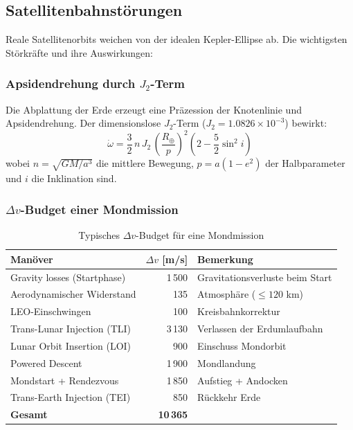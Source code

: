 ﻿\documentclass[12pt,a4paper]{article}
\newcommand{\Dv}{\Delta v}
\begin{document}
\subsection{Satellitenbahnstörungen}

Reale Satellitenorbits weichen von der idealen Kepler-Ellipse ab. Die wichtigsten
Störkräfte und ihre Auswirkungen:

\subsubsection{Apsidendrehung durch $J_2$-Term}

Die Abplattung der Erde erzeugt eine Präzession der Knotenlinie und Apsidendrehung.
Der dimensionslose $J_2$-Term ($J_2 = 1.0826 \times 10^{-3}$) bewirkt:
\[
  \dot{\omega} = \frac{3}{2}\,n\,J_2\,\left(\frac{R_\oplus}{p}\right)^2
    \left(2 - \frac{5}{2}\sin^2 i\right)
\]
wobei $n = \sqrt{GM/a^3}$ die mittlere Bewegung, $p = a(1-e^2)$ der Halbparameter
und $i$ die Inklination sind.

\subsubsection{$\Delta v$-Budget einer Mondmission}

\begin{table}[H]
\centering
\caption{Typisches $\Dv$-Budget für eine Mondmission}
\label{tab:dv_mond}
\begin{tabular}{lrl}
\toprule
\textbf{Manöver} & \textbf{$\Dv$ [m/s]} & \textbf{Bemerkung}\\
\midrule
Gravity losses (Startphase)       & 1\,500 & Gravitationsverluste beim Start\\
Aerodynamischer Widerstand        &   135  & Atmosphäre ($\leq 120$ km)\\
LEO-Einschwingen                  &   100  & Kreisbahnkorrektur\\
Trans-Lunar Injection (TLI)       & 3\,130 & Verlassen der Erdumlaufbahn\\
Lunar Orbit Insertion (LOI)       &   900  & Einschuss Mondorbit\\
Powered Descent                   & 1\,900 & Mondlandung\\
Mondstart + Rendezvous            & 1\,850 & Aufstieg + Andocken\\
Trans-Earth Injection (TEI)       &   850  & Rückkehr Erde\\
\midrule
\textbf{Gesamt}                   & \textbf{10\,365} & \\
\bottomrule
\end{tabular}
\end{table}
\end{document}
